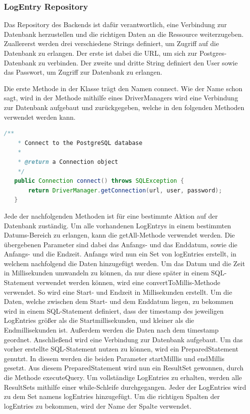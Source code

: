 \subsubsection{LogEntry Repository}
Das Repository des Backends ist dafür verantwortlich, eine Verbindung zur Datenbank herzustellen und die richtigen Daten an die Ressource weiterzugeben. Zuallererst werden drei verschiedene Strings definiert, um Zugriff auf die Datenbank zu erlangen. Der erste ist dabei die URL, um sich zur Postgres-Datenbank zu verbinden. Der zweite und dritte String definiert den User sowie das Passwort, um Zugriff zur Datenbank zu erlangen. 

Die erste Methode in der Klasse trägt den Namen connect. Wie der Name schon sagt, wird in der Methode mithilfe eines DriverManagers wird eine Verbindung zur Datenbank aufgebaut und zurückgegeben, welche in den folgenden Methoden verwendet werden kann. 

\begin{lstlisting}[language=java,caption=Connect to SQL Database,label=lst:impl:connect]
    /**
    * Connect to the PostgreSQL database
    *
    * @return a Connection object
    */
   public Connection connect() throws SQLException {
       return DriverManager.getConnection(url, user, password);
   }   
\end{lstlisting}

Jede der nachfolgenden Methoden ist für eine bestimmte Aktion auf der Datenbank zuständig. 
Um alle vorhandenen LogEntrys in einem bestimmten Datums-Bereich zu erlangen, kann die getAll-Methode verwendet werden. Die übergebenen Parameter sind dabei das Anfangs- und das Enddatum, sowie die Anfangs- und die Endzeit. Anfangs wird nun ein Set von logEntries erstellt, in welchem nachfolgend die Daten hinzugefügt werden. Um das Datum und die Zeit in Millisekunden umwandeln zu können, da nur diese später in einem SQL-Statement verwendet werden können, wird eine convertToMillis-Methode verwendet. So wird eine Start- und Endzeit in Millisekunden erstellt. 
Um die Daten, welche zwischen dem Start- und dem Enddatum liegen, zu bekommen wird in einem SQL-Statement definiert, dass der timestamp des jeweiligen LogEntries größer als die Startmillisekunden, und kleiner als die Endmillisekunden ist. Außerdem werden die Daten nach dem timestamp geordnet. Anschließend wird eine Verbindung zur Datenbank aufgebaut. Um das vorher erstellte SQL-Statement nutzen zu können, wird ein PreparedStatement genutzt. In diesem werden die beiden Parameter startMilllis und endMillis gesetzt. Aus diesem PreparedStatement wird nun ein ResultSet gewonnen, durch die Methode executeQuery. Um vollständige LogEntries zu erhalten, werden alle ResultSets mithilfe einer while-Schleife durchgegangen. Jeder der LogEntries wird zu dem Set namens logEntries hinzugefügt. Um die richtigen Spalten der logEntries zu bekommen, wird der Name der Spalte verwendet. 

